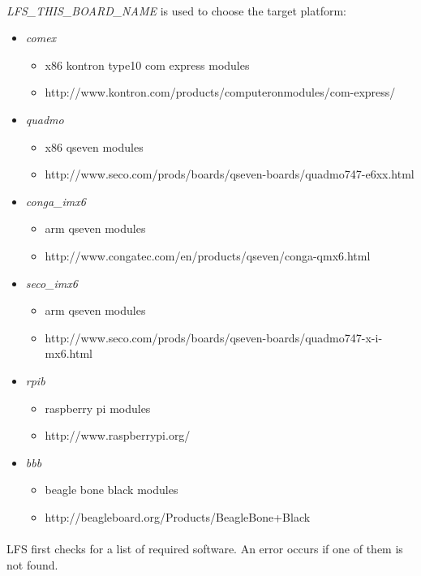 \documentclass[a4paper, 11pt]{article}
\begin{document}
\paragraph{}
\textit{LFS\_THIS\_BOARD\_NAME} is used to choose the target platform:
\begin{itemize}
\item \textit{comex}
 \begin{itemize}
 \item x86 kontron type10 com express modules
 \item http://www.kontron.com/products/computeronmodules/com-express/
 \end{itemize}
\item \textit{quadmo}
 \begin{itemize}
 \item x86 qseven modules
 \item http://www.seco.com/prods/boards/qseven-boards/quadmo747-e6xx.html
 \end{itemize}
\item \textit{conga\_imx6}
 \begin{itemize}
 \item arm qseven modules
 \item http://www.congatec.com/en/products/qseven/conga-qmx6.html
 \end{itemize}
\item \textit{seco\_imx6}
 \begin{itemize}
 \item arm qseven modules
 \item http://www.seco.com/prods/boards/qseven-boards/quadmo747-x-i-mx6.html
 \end{itemize}
\item \textit{rpib}
 \begin{itemize}
 \item raspberry pi modules
 \item http://www.raspberrypi.org/
 \end{itemize}
\item \textit{bbb}
 \begin{itemize}
 \item beagle bone black modules
 \item http://beagleboard.org/Products/BeagleBone+Black
 \end{itemize}
\end{itemize}

\paragraph{}
LFS first checks for a list of required software. An error occurs if one of them
is not found.
\end{document}
